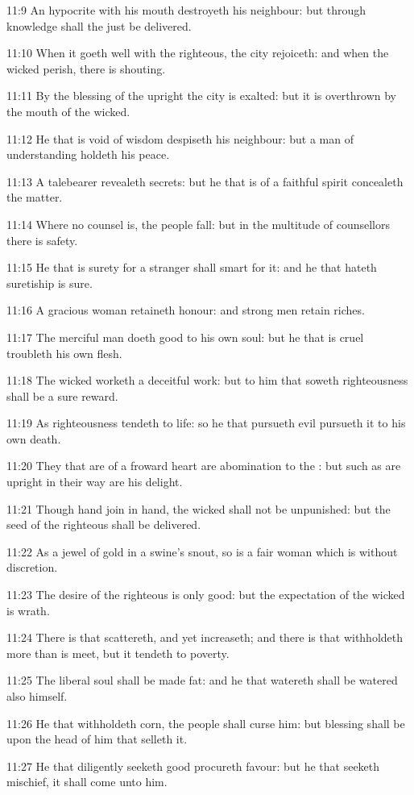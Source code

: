 11:9 An hypocrite with his mouth destroyeth his neighbour: but through knowledge shall the just be delivered.

11:10 When it goeth well with the righteous, the city rejoiceth: and when the wicked perish, there is shouting.

11:11 By the blessing of the upright the city is exalted: but it is overthrown by the mouth of the wicked.

11:12 He that is void of wisdom despiseth his neighbour: but a man of understanding holdeth his peace.

11:13 A talebearer revealeth secrets: but he that is of a faithful spirit concealeth the matter.

11:14 Where no counsel is, the people fall: but in the multitude of counsellors there is safety.

11:15 He that is surety for a stranger shall smart for it: and he that hateth suretiship is sure.

11:16 A gracious woman retaineth honour: and strong men retain riches.

11:17 The merciful man doeth good to his own soul: but he that is cruel troubleth his own flesh.

11:18 The wicked worketh a deceitful work: but to him that soweth righteousness shall be a sure reward.

11:19 As righteousness tendeth to life: so he that pursueth evil pursueth it to his own death.

11:20 They that are of a froward heart are abomination to the \LORD: but such as are upright in their way are his delight.

11:21 Though hand join in hand, the wicked shall not be unpunished: but the seed of the righteous shall be delivered.

11:22 As a jewel of gold in a swine's snout, so is a fair woman which is without discretion.

11:23 The desire of the righteous is only good: but the expectation of the wicked is wrath.

11:24 There is that scattereth, and yet increaseth; and there is that withholdeth more than is meet, but it tendeth to poverty.

11:25 The liberal soul shall be made fat: and he that watereth shall be watered also himself.

11:26 He that withholdeth corn, the people shall curse him: but blessing shall be upon the head of him that selleth it.

11:27 He that diligently seeketh good procureth favour: but he that seeketh mischief, it shall come unto him.

